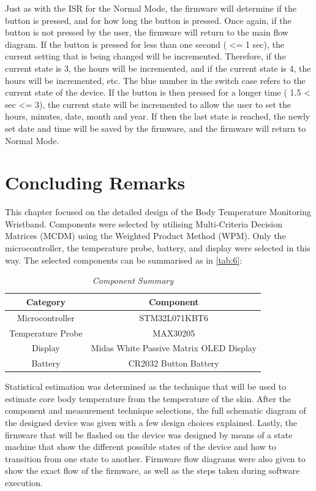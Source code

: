 \noindent
Just as with the ISR for the Normal Mode, the firmware will determine if the button is pressed, and for how long the button is pressed. Once again, if the button is not pressed by the user, the firmware will return to the main flow diagram. If the button is pressed for less than one second ( <= 1 sec), the current setting that is being changed will be incremented. Therefore, if the current state is 3, the hours will be incremented, and if the current state is 4, the hours will be incremented, etc. The blue number in the switch case refers to the current state of the device. If the button is then pressed for a longer time ( 1.5 < sec <= 3), the current state will be incremented to allow the user to set the hours, minutes, date, month and year. If then the last state is reached, the newly set date and time will be saved by the firmware, and the firmware will return to Normal Mode.

\section{Concluding Remarks}
This chapter focused on the detailed design of the Body Temperature Monitoring Wristband. Components were selected by utilising Multi-Criteria Decision Matrices (MCDM) using the Weighted Product Method (WPM). Only the microcontroller, the temperature probe, battery, and display were selected in this way. The selected components can be summarised as in \autoref{tab:6}:
\begin{table}[H]
	\centering
	\caption{\textit{Component Summary}}
	\label{tab:6}
	\begin{tabular}{|c|c|}
		\hline
		\textbf{Category} & \textbf{Component} \\
		\hline
		\hline
		Microcontroller & STM32L071KBT6 \\
		\hline
		Temperature Probe & MAX30205\\
		\hline
		Display & Midas White Passive Matrix OLED Display \\
		\hline
		Battery & CR2032 Button Battery \\
		\hline
	\end{tabular}
\end{table}
\noindent
Statistical estimation was determined as the technique that will be used to estimate core body temperature from the temperature of the skin. After the component and measurement technique selections, the full schematic diagram of the designed device was given with a few design choices explained. Lastly, the firmware that will be flashed on the device was designed by means of a state machine that show the different possible states of the device and how to transition from one state to another. Firmware flow diagrams were also given to show the exact flow of the firmware, as well as the steps taken during software execution. 